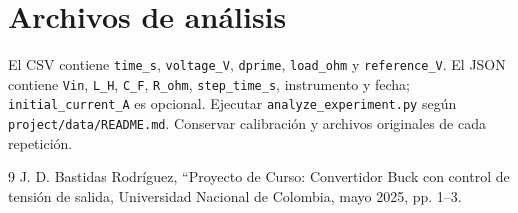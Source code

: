 \documentclass[conference,letterpaper]{IEEEtran}
\begin{document}
\appendices\section{Archivos de análisis}\begingroup\raggedright
El CSV contiene \texttt{time\_s}, \texttt{voltage\_V}, \texttt{dprime}, \texttt{load\_ohm} y \texttt{reference\_V}. El JSON contiene \texttt{Vin}, \texttt{L\_H}, \texttt{C\_F}, \texttt{R\_ohm}, \texttt{step\_time\_s}, instrumento y fecha; \texttt{initial\_current\_A} es opcional. Ejecutar \texttt{analyze\_experiment.py} según \texttt{project/data/README.md}. Conservar calibración y archivos originales de cada repetición.

\par\endgroup
\begin{thebibliography}{9}
J. D. Bastidas Rodríguez, ``Proyecto de Curso: Convertidor Buck con control de tensión de salida, Universidad Nacional de Colombia, mayo 2025, pp. 1--3.
\end{thebibliography}
\end{document}
